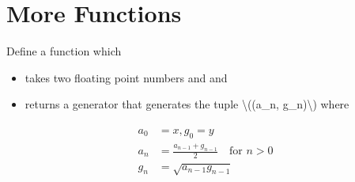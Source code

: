 \documentclass[letterpaper,10pt,english]{sphinxmanual}
\begin{document}
\section{More Functions}
\label{\detokenize{Review/Review Questions:more-functions}}
 Define a function  which
\begin{itemize}
\item {} 
takes two floating point numbers   and  and

\item {} 
returns a generator that generates the tuple \textbackslash{}((a\_n, g\_n)\textbackslash{}) where

\end{itemize}
\begin{equation*}
\begin{split}
\begin{aligned}
a_0 &= x, g_0 = y \\
a_n &= \frac{a_{n-1} + g_{n-1}}2 \quad \text{for }n>0\\
g_n &= \sqrt{a_{n-1} g_{n-1}}
\end{aligned}
\end{split}
\end{equation*}
\begin{sphinxVerbatim}[commandchars=\\\{\}]
  
        
     
          
              
\end{sphinxVerbatim}
\end{document}
